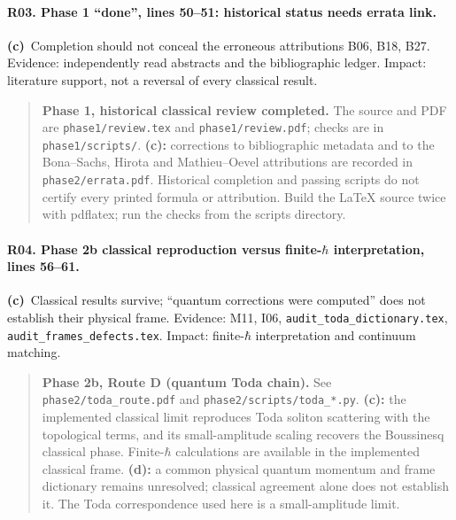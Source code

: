 \documentclass[11pt,a4paper]{article}
\newcommand{\C}{\textbf{(c)}\ }
\newcommand{\file}[1]{\nolinkurl{#1}}
\begin{document}
\paragraph{R03. Phase 1 ``done'', lines 50--51: historical status needs errata link.}
\C Completion should not conceal the erroneous attributions B06, B18, B27.
Evidence: independently read abstracts and the bibliographic ledger.
Impact: literature support, not a reversal of every classical result.
\begin{quote}
\textbf{Phase 1, historical classical review completed.} The source and
PDF are \file{phase1/review.tex} and \file{phase1/review.pdf}; checks are
in \file{phase1/scripts/}. \textbf{(c):} corrections to bibliographic
metadata and to the Bona--Sachs, Hirota and Mathieu--Oevel attributions
are recorded in \file{phase2/errata.pdf}. Historical completion and
passing scripts do not certify every printed formula or attribution.
Build the LaTeX source twice with pdflatex; run the checks from the scripts
directory.
\end{quote}

\paragraph{R04. Phase 2b classical reproduction versus finite-$\hbar$ interpretation, lines 56--61.}
\C Classical results survive; ``quantum corrections were computed'' does
not establish their physical frame. Evidence: M11, I06,
\file{audit_toda_dictionary.tex}, \file{audit_frames_defects.tex}.
Impact: finite-$\hbar$ interpretation and continuum matching.
\begin{quote}
\textbf{Phase 2b, Route D (quantum Toda chain).} See
\file{phase2/toda_route.pdf} and \file{phase2/scripts/toda_*.py}.
\textbf{(c):} the implemented classical limit reproduces Toda soliton
scattering with the topological terms, and its small-amplitude scaling
recovers the Boussinesq classical phase. Finite-$\hbar$ calculations are
available in the implemented classical frame. \textbf{(d):} a common
physical quantum momentum and frame dictionary remains unresolved;
classical agreement alone does not establish it. The Toda correspondence
used here is a small-amplitude limit.
\end{quote}
\end{document}
